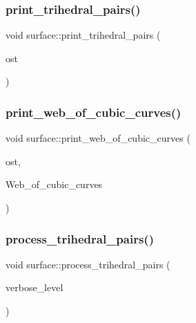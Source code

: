 \mbox{\label{classsurface_a3af89c1a0ce86c3d68b5683493c7d919}} 
\subsubsection{\texorpdfstring{print\+\_\+trihedral\+\_\+pairs()}{print\_trihedral\_pairs()}}
{\footnotesize\ttfamily void surface\+::print\+\_\+trihedral\+\_\+pairs (\begin{DoxyParamCaption}\item[{ostream \&}]{ost }\end{DoxyParamCaption})}

\mbox{\label{classsurface_ad10e58c699fb8e3bc9def13dbf9d44c8}} 
\subsubsection{\texorpdfstring{print\+\_\+web\+\_\+of\+\_\+cubic\+\_\+curves()}{print\_web\_of\_cubic\_curves()}}
{\footnotesize\ttfamily void surface\+::print\+\_\+web\+\_\+of\+\_\+cubic\+\_\+curves (\begin{DoxyParamCaption}\item[{ostream \&}]{ost,  }\item[{\mbox{\hyperlink{galois_8h_a09fddde158a3a20bd2dcadb609de11dc}{I\+NT}} $\ast$}]{Web\+\_\+of\+\_\+cubic\+\_\+curves }\end{DoxyParamCaption})}

\mbox{\label{classsurface_a94cd90088cd556805d058d0a72c2f372}} 
\subsubsection{\texorpdfstring{process\+\_\+trihedral\+\_\+pairs()}{process\_trihedral\_pairs()}}
{\footnotesize\ttfamily void surface\+::process\+\_\+trihedral\+\_\+pairs (\begin{DoxyParamCaption}\item[{\mbox{\hyperlink{galois_8h_a09fddde158a3a20bd2dcadb609de11dc}{I\+NT}}}]{verbose\+\_\+level }\end{DoxyParamCaption})}


